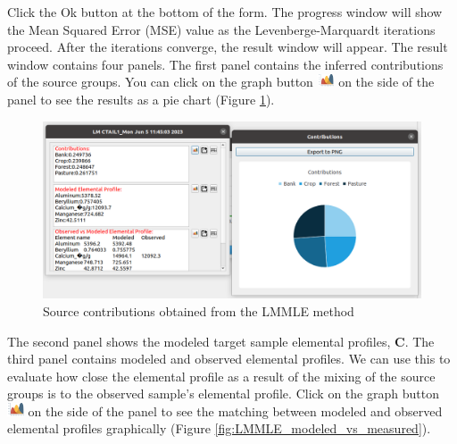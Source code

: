 \documentclass[12pt]{report}
\begin{document}
Click the Ok button at the bottom of the form. The progress window will show the Mean Squared Error (MSE) value as the Levenberge-Marquardt iterations proceed. After the iterations converge, the result window will appear. The result window contains four panels. The first panel contains the inferred contributions of the source groups. You can click on the graph button \includegraphics[width=0.5cm]{Figures/Graph.png} on the side of the panel to see the results as a pie chart (Figure \ref{fig:contribution_pie_chart}). 

\begin{figure}[ht]
    \centering
    \includegraphics[width=15cm]{Figures/Contribution_Pie_Chart.png}
    \caption{Source contributions obtained from the LMMLE method}
    \label{fig:contribution_pie_chart}
\end{figure}
\FloatBarrier

The second panel shows the modeled target sample elemental profiles, $\mathbf{C}$. The third panel contains modeled and observed elemental profiles. We can use this to evaluate how close the elemental profile as a result of the mixing of the source groups is to the observed sample's elemental profile. Click on the graph button \includegraphics[width=0.5cm]{Figures/Graph.png} on the side of the panel to see the matching between modeled and observed elemental profiles graphically (Figure \ref{fig:LMMLE_modeled_vs_measured}).  
\end{document}
